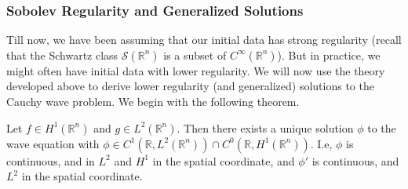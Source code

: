 \documentclass{article}
\numberwithin{equation}{section}
\begin{document}
	\subsubsection{Sobolev Regularity and Generalized Solutions}
	
	Till now, we have been assuming that our initial data has strong regularity (recall that the Schwartz class $\mathcal{S}(\mathbb{R}^{n})$ is a subset of $C^{\infty}(\mathbb{R}^{n})$). But in practice, we might often have initial data with lower regularity. We will now use the theory developed above to derive lower regularity (and generalized) solutions to the Cauchy wave problem. We begin with the following theorem. 
	
	\begin{theorem}
		Let $f \in H^{1}(\mathbb{R}^{n})$ and $g \in L^{2}(\mathbb{R}^{n})$. Then there exists a unique solution $\phi$ to the wave equation with $\phi \in C^{1}(\mathbb{R}, L^{2}(\mathbb{R}^{n})) \cap C^{0}(\mathbb{R}, H^{1}(\mathbb{R}^{n}))$. I.e, $\phi$ is continuous, and in $L^{2}$ and $H^{1}$ in the spatial coordinate, and $\phi'$ is continuous, and $L^{2}$ in the spatial coordinate. 
	\end{theorem}
\end{document}
